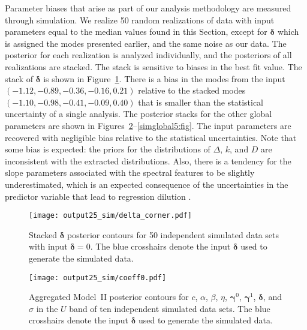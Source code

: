 \documentclass{aastex61}   	%
\begin{document}
Parameter biases that arise as part of our analysis methodology are measured through simulation.
We realize 50 random realizations of data with input  parameters equal to the median values found in
this Section, except for $\pmb{\delta}$ which is assigned the modes presented earlier, and the same noise as our data.  The posterior for each realization is analyzed individually, and the posteriors of all realizations are stacked.  The stack is sensitive to
biases in the best fit value.
The stack of  $\pmb{\delta}$  is shown in Figure~\ref{simdelta:fig}.  There is a bias in the
modes from the input  $(-1.12, -0.89, -0.36,  -0.16, 0.21)$ relative to the stacked modes $(-1.10, -0.98, -0.41, -0.09, 0.40)$
that is smaller than the statistical uncertainty of a single analysis.
The posterior stacks for the other global parameters 
are shown in Figures~\ref{simglobal1:fig}--\ref{simglobal5:fig}.  The input parameters are recovered with negligible bias
relative to the statistical uncertainties. 
Note that some bias is expected: the priors for the distributions of $\Delta$, $k$, and $D$ are inconsistent
with the extracted distributions.  Also, 
there is a tendency for the slope parameters associated with the spectral features to be slightly underestimated, which is an expected consequence of 
the uncertainties in the predictor variable that lead to 
regression dilution \citep{spearman04}.
\color{black}

\begin{figure}[htbp] %
   \centering
   \texttt{[image: output25\_sim/delta\_corner.pdf]} 
            \caption{Stacked $\pmb{\delta}$ posterior contours for 50 independent simulated data sets with input $\pmb{\delta}=0$.
            The blue crosshairs denote the input $\pmb{\delta}$ used to generate the simulated data.
            \label{simdelta:fig}}
\end{figure}


\begin{figure}[htbp] %
   \centering
   \texttt{[image: output25\_sim/coeff0.pdf]} 
            \caption{Aggregated Model~II posterior contours for $c$, $\alpha$, $\beta$, $\eta$, $\pmb{\gamma}^0$, $\pmb{\gamma}^1$,  $\pmb{\delta}$, and $\sigma$ in the $U$ band of ten independent simulated data sets.  The blue crosshairs denote the input $\pmb{\delta}$ used to generate the simulated data.
            \label{simglobal1:fig}}
\end{figure}
\end{document}
